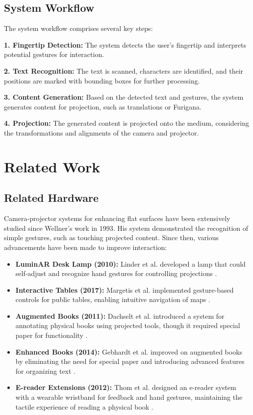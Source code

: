 \documentclass[10pt, a4j,dvipdfmx, twocolumn]{jarticle}
\begin{document}
\subsection{System Workflow}

The system workflow comprises several key steps:  

\textbf{1. Fingertip Detection:} The system detects the user’s fingertip and interprets potential gestures for interaction.  

\textbf{2. Text Recognition:} The text is scanned, characters are identified, and their positions are marked with bounding boxes for further processing.  

\textbf{3. Content Generation:} Based on the detected text and gestures, the system generates content for projection, such as translations or Furigana.  

\textbf{4. Projection:} The generated content is projected onto the medium, considering the transformations and alignments of the camera and projector.





\section{Related Work}

\subsection{Related Hardware}

Camera-projector systems for enhancing flat surfaces have been extensively studied since Wellner’s work in 1993. His system demonstrated the recognition of simple gestures, such as touching projected content. Since then, various advancements have been made to improve interaction:

\begin{itemize}
    \item \textbf{LuminAR Desk Lamp (2010):} Linder et al. developed a lamp that could self-adjust and recognize hand gestures for controlling projections \cite{linder2010luminar}.
    \item \textbf{Interactive Tables (2017):} Margetis et al. implemented gesture-based controls for public tables, enabling intuitive navigation of maps \cite{margetis2017interacting}.
    \item \textbf{Augmented Books (2011):} Dachselt et al. introduced a system for annotating physical books using projected tools, though it required special paper for functionality \cite{dachselt2011interacting}.
    \item \textbf{Enhanced Books (2014):} Gebhardt et al. improved on augmented books by eliminating the need for special paper and introducing advanced features for organizing text \cite{gebhardt2014employing}.
    \item \textbf{E-reader Extensions (2012):} Thom et al. designed an e-reader system with a wearable wristband for feedback and hand gestures, maintaining the tactile experience of reading a physical book \cite{thom2012holding}.
\end{itemize}
\end{document}
